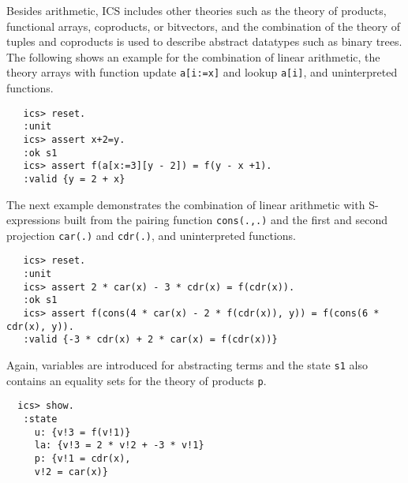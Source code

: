 \documentclass[12pt]{article}
\begin{document}
Besides arithmetic, ICS includes other theories
such as the theory of products, functional arrays, coproducts,
or bitvectors, and the combination of the theory of tuples and 
coproducts is used to describe abstract datatypes such as binary trees.
The following shows an example for the combination of linear arithmetic,
the theory arrays with function update {\tt a[i:=x]} and lookup {\tt a[i]}, 
and uninterpreted functions.
  \begin{verbatim}
   ics> reset.
   :unit
   ics> assert x+2=y.
   :ok s1
   ics> assert f(a[x:=3][y - 2]) = f(y - x +1).
   :valid {y = 2 + x}
  \end{verbatim}
The next example demonstrates the combination of linear arithmetic
with S-expressions built from the pairing function {\tt cons(.,.)} and 
the first and second projection {\tt car(.)} and {\tt cdr(.)}, and 
uninterpreted functions.
   \begin{verbatim}
   ics> reset.
   :unit
   ics> assert 2 * car(x) - 3 * cdr(x) = f(cdr(x)).
   :ok s1
   ics> assert f(cons(4 * car(x) - 2 * f(cdr(x)), y)) = f(cons(6 * cdr(x), y)).
   :valid {-3 * cdr(x) + 2 * car(x) = f(cdr(x))}
  \end{verbatim}
Again, variables are introduced for abstracting terms and the state {\tt s1}
also contains  an equality sets for the theory of products {\tt p}\@.
  \begin{verbatim}
  ics> show.
   :state 
     u: {v!3 = f(v!1)}
     la: {v!3 = 2 * v!2 + -3 * v!1}
     p: {v!1 = cdr(x), 
     v!2 = car(x)}
  \end{verbatim}
\end{document}
